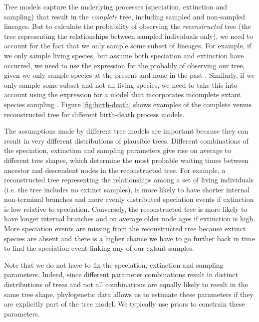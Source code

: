 Tree models capture the underlying processes (speciation, extinction and sampling) that result in the \textit{complete} tree, including sampled and non-sampled lineages. But to calculate the probability of observing the  \textit{reconstructed} tree (the tree representing the relationships between sampled individuals only), we need to account for the fact that we only sample some subset of lineages.
For example, if we only sample living species, but assume both speciation and extinction have occurred, we need to use the expression for the probably of observing our tree, given we only sample species at the present and none in the past \citep{Thompson1975,Gernhard2008, Stadler2009}.  Similarly, if we only sample some subset and not all living species, we need to take this into account using the expression for a model that incorporates incomplete extant species sampling \citep{Yang1997,Stadler2009}.
Figure \ref{fig:birth-death} shows examples of the complete versus reconstructed tree for different birth-death process models.


The assumptions made by different tree models are important because they can result in very different distributions of plausible trees.
Different combinations of the speciation, extinction and sampling parameters give rise on average to different tree shapes, which determine the most probable waiting times between ancestor and descendent nodes 
in the reconstructed tree.
For example, a reconstructed tree representing the relationships among a set of living individuals (i.e. the tree includes no extinct samples),  
 is more likely to have shorter internal non-terminal branches and more evenly distributed speciation events if extinction is low relative to speciation.
Conversely, the reconstructed tree is more likely to have longer internal branches and on average older node ages if extinction is high.
More speciation events are missing from the reconstructed tree because extinct species are absent and there is a higher chance we have to go further back in time to find the speciation event linking any of our extant samples.

Note that we do not have to fix the speciation, extinction and sampling parameters. 
Indeed, since different parameter combinations result in distinct distributions of trees and not all combinations are equally likely to result in the same tree shape, phylogenetic data  allows us to estimate these parameters if they are explicitly part of the tree model. 
We typically use priors to constrain these parameters.

